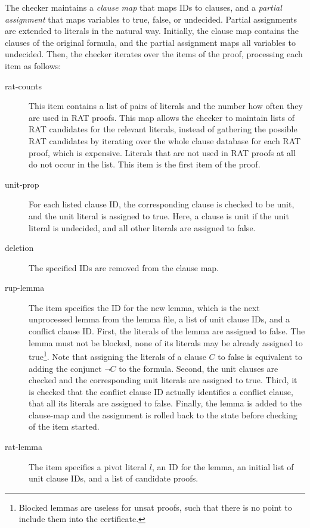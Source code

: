 \documentclass{llncs}
\begin{document}
The checker maintains a \emph{clause map} that maps IDs to clauses, and a \emph{partial assignment} that maps variables to true, false, or undecided. 
Partial assignments are extended to literals in the natural way.
Initially, the clause map contains the clauses of the original formula, and the partial assignment maps all variables to undecided.
Then, the checker iterates over the items of the proof, processing each item as follows:
\begin{description}
    \item[rat-counts] This item contains a list of pairs of literals and the number how often they are used in RAT proofs. 
      This map allows the checker to maintain lists of RAT candidates for the relevant literals, instead of gathering the 
      possible RAT candidates by iterating over the whole clause database for each RAT proof, which is expensive.
      Literals that are not used in RAT proofs at all do not occur in the list. This item is the first item of the proof.
  \item[unit-prop] 
    For each listed clause ID, the corresponding clause is checked to be unit, and the unit literal is assigned to true.
    Here, a clause is unit if the unit literal is undecided, and all other literals are assigned to false.
  \item[deletion] The specified IDs are removed from the clause map.
  \item[rup-lemma] The item specifies the ID for the new lemma, which is the next unprocessed lemma from the lemma file, a list of unit clause IDs, and a conflict clause ID.
      First, the literals of the lemma are assigned to false. The lemma must not be blocked, \ie none of its literals may be already assigned to true\footnote{Blocked lemmas are useless for unsat proofs, such that there is no point to include them into the certificate.}.
        Note that assigning the literals of a clause $C$ to false is equivalent to adding the conjunct $\neg C$ to the formula. 
      Second, the unit clauses are checked and the corresponding unit literals are assigned to true.
      Third, it is checked that the conflict clause ID actually identifies a conflict clause, \ie that all its literals are assigned to false.
      Finally, the lemma is added to the clause-map and the assignment is rolled back to the state before checking of the item started.
    \item[rat-lemma] The item specifies a pivot literal $l$, an ID for the lemma, an initial list of unit clause IDs, and a list of
      candidate proofs. 

\end{description}
\end{document}
